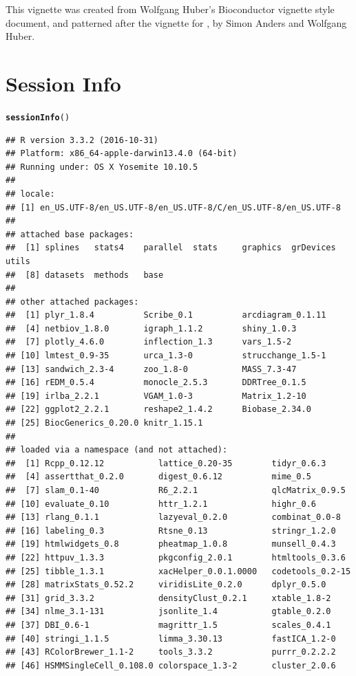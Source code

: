 \documentclass[10pt,oneside]{article}\usepackage[]{graphicx}\usepackage[]{color}
\makeatletter
\newcommand{\hlstd}[1]{\textcolor[rgb]{0.345,0.345,0.345}{#1}}%
\newcommand{\hlkwd}[1]{\textcolor[rgb]{0.737,0.353,0.396}{\textbf{#1}}}%
\newenvironment{kframe}{%
 \def\at@end@of@kframe{}%
 \ifinner\ifhmode%
  \def\at@end@of@kframe{\end{minipage}}%
  \begin{minipage}{\columnwidth}%
 \fi\fi%
 \def\FrameCommand##1{\hskip\@totalleftmargin \hskip-\fboxsep
 \colorbox{shadecolor}{##1}\hskip-\fboxsep
     \hskip-\linewidth \hskip-\@totalleftmargin \hskip\columnwidth}%
 \MakeFramed {\advance\hsize-\width
   \@totalleftmargin\z@ \linewidth\hsize
   \@setminipage}}%
 {\par\unskip\endMakeFramed%
 \at@end@of@kframe}
\newenvironment{knitrout}{}{} %
\makeatother
\begin{document}
This vignette was created from Wolfgang Huber's Bioconductor vignette style document, and patterned after the vignette for , by Simon Anders and Wolfgang Huber.

\section{Session Info}
\begin{knitrout}
\color{fgcolor}\begin{kframe}
\begin{alltt}
\hlkwd{sessionInfo}\hlstd{()}
\end{alltt}
\begin{verbatim}
## R version 3.3.2 (2016-10-31)
## Platform: x86_64-apple-darwin13.4.0 (64-bit)
## Running under: OS X Yosemite 10.10.5
## 
## locale:
## [1] en_US.UTF-8/en_US.UTF-8/en_US.UTF-8/C/en_US.UTF-8/en_US.UTF-8
## 
## attached base packages:
##  [1] splines   stats4    parallel  stats     graphics  grDevices utils    
##  [8] datasets  methods   base     
## 
## other attached packages:
##  [1] plyr_1.8.4          Scribe_0.1          arcdiagram_0.1.11  
##  [4] netbiov_1.8.0       igraph_1.1.2        shiny_1.0.3        
##  [7] plotly_4.6.0        inflection_1.3      vars_1.5-2         
## [10] lmtest_0.9-35       urca_1.3-0          strucchange_1.5-1  
## [13] sandwich_2.3-4      zoo_1.8-0           MASS_7.3-47        
## [16] rEDM_0.5.4          monocle_2.5.3       DDRTree_0.1.5      
## [19] irlba_2.2.1         VGAM_1.0-3          Matrix_1.2-10      
## [22] ggplot2_2.2.1       reshape2_1.4.2      Biobase_2.34.0     
## [25] BiocGenerics_0.20.0 knitr_1.15.1       
## 
## loaded via a namespace (and not attached):
##  [1] Rcpp_0.12.12           lattice_0.20-35        tidyr_0.6.3           
##  [4] assertthat_0.2.0       digest_0.6.12          mime_0.5              
##  [7] slam_0.1-40            R6_2.2.1               qlcMatrix_0.9.5       
## [10] evaluate_0.10          httr_1.2.1             highr_0.6             
## [13] rlang_0.1.1            lazyeval_0.2.0         combinat_0.0-8        
## [16] labeling_0.3           Rtsne_0.13             stringr_1.2.0         
## [19] htmlwidgets_0.8        pheatmap_1.0.8         munsell_0.4.3         
## [22] httpuv_1.3.3           pkgconfig_2.0.1        htmltools_0.3.6       
## [25] tibble_1.3.1           xacHelper_0.0.1.0000   codetools_0.2-15      
## [28] matrixStats_0.52.2     viridisLite_0.2.0      dplyr_0.5.0           
## [31] grid_3.3.2             densityClust_0.2.1     xtable_1.8-2          
## [34] nlme_3.1-131           jsonlite_1.4           gtable_0.2.0          
## [37] DBI_0.6-1              magrittr_1.5           scales_0.4.1          
## [40] stringi_1.1.5          limma_3.30.13          fastICA_1.2-0         
## [43] RColorBrewer_1.1-2     tools_3.3.2            purrr_0.2.2.2         
## [46] HSMMSingleCell_0.108.0 colorspace_1.3-2       cluster_2.0.6
\end{verbatim}
\end{kframe}
\end{knitrout}



\end{document}
